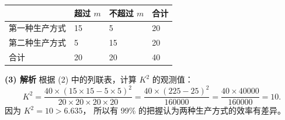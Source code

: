 \begin{answer}
\begin{center}
\begin{tabular}{llll}
\toprule
 & 超过 $m$ & 不超过 $m$ & 合计 \\
\midrule
第一种生产方式 & 15 & 5 & 20 \\
第二种生产方式 & 5 & 15 & 20 \\
合计 & 20 & 20 & 40 \\
\bottomrule
\end{tabular}
\end{center}

\textbf{(3) 解析} 根据 (2) 中的列联表，计算 $K^2$ 的观测值：
\nopagebreak[4]
\[K^2 = \dfrac{40 \times (15 \times 15 - 5 \times 5)^2}{20 \times 20 \times 20 \times 20} = \dfrac{40 \times (225 - 25)^2}{160000} = \dfrac{40 \times 40000}{160000} = 10.\]
因为 $K^2 = 10 > 6.635$，
所以有 99\% 的把握认为两种生产方式的效率有差异。




\end{answer}
